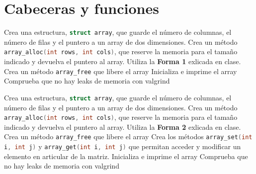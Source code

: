 \documentclass{tareas}
\begin{document}
\maketitle
\newpage
\tableofcontents
{}
\newpage

\section{Cabeceras y funciones}

\begin{problem}
\begin{statement}
	\subp Crea una estructura, \lstinline[language=C]|struct array|, que
	guarde el número de columnas, el número de filas y el puntero a un array
	de dos dimensiones.
	\subp Crea un método \lstinline[language=C]|array_alloc(int rows, int cols)|,
	que reserve la memoria para el tamaño indicado y devuelva el
	puntero al array. Utiliza la \textbf{Forma 1} exlicada en clase.
	\subp Crea un método \lstinline[language=C]|array_free| que libere el
	array
	\subp Inicializa e imprime el array
	\subp Comprueba que no hay leaks de memoria con valgrind
\end{statement}
\end{problem}

\begin{problem}
\begin{statement}
	\subp Crea una estructura, \lstinline[language=C]|struct array|, que
	guarde el número de columnas, el número de filas y el puntero a un array
	de dos dimensiones.
	\subp Crea un método \lstinline[language=C]|array_alloc(int rows, int cols)|,
	que reserve la memoria para el tamaño indicado y devuelva el
	puntero al array. Utiliza la \textbf{Forma 2} exlicada en clase.
	\subp Crea un método \lstinline[language=C]|array_free| que libere el
	array
	\subp Crea los métodos \lstinline[language=C]|array_set(int i, int j)| y
	\lstinline[language=C]|array_get(int i, int j)| que permitan acceder y
	modificar un elemento en articular de la matriz.
	\subp Inicializa e imprime el array
	\subp Comprueba que no hay leaks de memoria con valgrind
\end{statement}
\end{problem}
\end{document}
